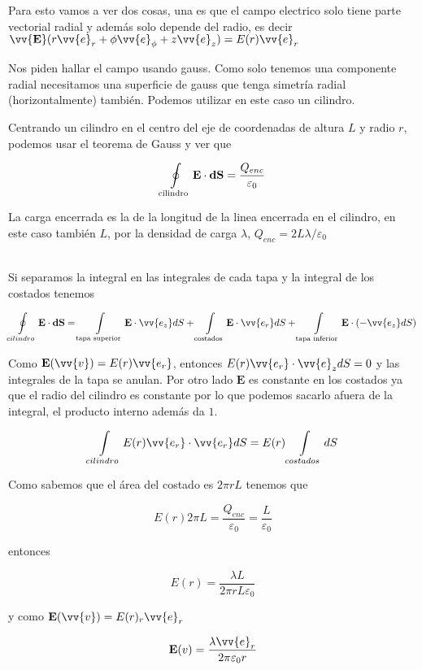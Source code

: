 \documentclass[leqno, 12pt, twoside, letterpaper]{book}
\def\efield{\textbf{E}}
\def\vdiff{\textbf{dS}}
\begin{document}
Para esto vamos a ver dos cosas, una es que el campo electrico solo tiene parte vectorial radial y además solo depende del radio, es decir $\vv{\efield}(r\vv{e}_r + \phi\vv{e}_{\phi} + z\vv{e}_z ) = E(r) \vv{e}_r$ 


Nos piden hallar el campo usando gauss. Como solo tenemos una componente radial necesitamos una superficie de gauss que tenga simetría radial (horizontalmente) también. Podemos utilizar en este caso un cilindro.

Centrando un cilindro en el centro del eje de coordenadas de altura $L$ y radio $r$, podemos usar el teorema de Gauss y ver que 

\[ \oint\displaylimits_{\textrm{cilindro}} \efield \cdot \vdiff = \dfrac{Q_{enc}}{\varepsilon_0}  \]

La carga encerrada es la de la longitud de la linea encerrada en el cilindro, en este caso también $L$, por la densidad de carga $\lambda$, $Q_{enc} = 2L\lambda/\varepsilon_0$

\hfill\\
\noindent Si separamos la integral en las integrales de cada tapa y la integral de los costados tenemos

\[ \oint\displaylimits_{cilindro} \efield \cdot \vdiff = \int\displaylimits_{\textrm{tapa superior}} \efield \cdot \vv{e_z}dS  + \int\displaylimits_{\textrm{costados}} \efield \cdot \vv{e_r}dS  + \int\displaylimits_{\textrm{tapa inferior}} \efield \cdot (-\vv{e_z}dS )\]

Como $\efield(\vv{v}) = E(r) \vv{e_r} $, entonces $E(r) \vv{e_r}  \cdot \vv{e}_z dS = 0$ y las integrales de la tapa se anulan. Por otro lado $\efield$ es constante en los costados ya que el radio del cilindro es constante por lo que podemos sacarlo afuera de la integral, el producto interno además da $1$.

\[ \int\displaylimits_{cilindro} E(r) \vv{e_r} \cdot \vv{e_r}dS =   E(r)  \int\displaylimits_{costados}dS \]

Como sabemos que el área del costado es $2\pi r L$ tenemos que

\[ E(r) 2\pi  L = \dfrac{Q_{enc}}{\varepsilon_0} = \dfrac{L}{\varepsilon_0} \]

entonces

\[ E(r) = \dfrac{\lambda L}{2\pi r L \varepsilon_0}\]

y como $\efield(\vv{v}) = E(r)_r \vv{e}_r$

\[ \efield(v) = \dfrac{\lambda \vv{e}_r}{2\pi  \varepsilon_0r} \]
\end{document}
